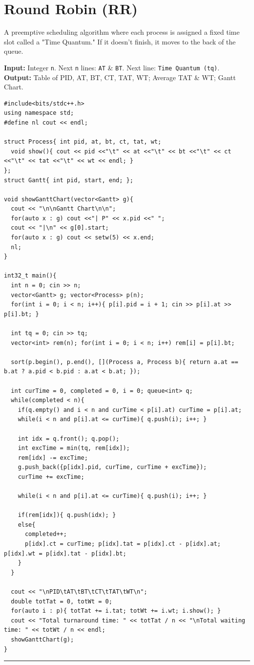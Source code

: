 \documentclass[10pt, a4paper]{article}
\begin{document}
\section{Round Robin (RR)}
A preemptive scheduling algorithm where each process is assigned a fixed time slot called a "Time Quantum." If it doesn't finish, it moves to the back of the queue.

\begin{tcolorbox}[title=Input \& Output Format, iobox]
\textbf{Input:} Integer \texttt{n}. Next \texttt{n} lines: \texttt{AT} \& \texttt{BT}. Next line: \texttt{Time Quantum (tq)}.\\
\textbf{Output:} Table of PID, AT, BT, CT, TAT, WT; Average TAT \& WT; Gantt Chart.
\end{tcolorbox}

\begin{lstlisting}
#include<bits/stdc++.h>
using namespace std;
#define nl cout << endl;

struct Process{ int pid, at, bt, ct, tat, wt;
  void show(){ cout << pid <<"\t" << at <<"\t" << bt <<"\t" << ct <<"\t" << tat <<"\t" << wt << endl; }
};
struct Gantt{ int pid, start, end; };

void showGanttChart(vector<Gantt> g){
  cout << "\n\nGantt Chart\n\n";
  for(auto x : g) cout <<"| P" << x.pid <<" ";
  cout << "|\n" << g[0].start;
  for(auto x : g) cout << setw(5) << x.end;
  nl;
}

int32_t main(){
  int n = 0; cin >> n;
  vector<Gantt> g; vector<Process> p(n);
  for(int i = 0; i < n; i++){ p[i].pid = i + 1; cin >> p[i].at >> p[i].bt; }

  int tq = 0; cin >> tq;
  vector<int> rem(n); for(int i = 0; i < n; i++) rem[i] = p[i].bt;
  
  sort(p.begin(), p.end(), [](Process a, Process b){ return a.at == b.at ? a.pid < b.pid : a.at < b.at; });

  int curTime = 0, completed = 0, i = 0; queue<int> q;
  while(completed < n){
    if(q.empty() and i < n and curTime < p[i].at) curTime = p[i].at;
    while(i < n and p[i].at <= curTime){ q.push(i); i++; }

    int idx = q.front(); q.pop();
    int excTime = min(tq, rem[idx]);
    rem[idx] -= excTime;
    g.push_back({p[idx].pid, curTime, curTime + excTime});
    curTime += excTime;

    while(i < n and p[i].at <= curTime){ q.push(i); i++; }

    if(rem[idx]){ q.push(idx); }
    else{
      completed++;
      p[idx].ct = curTime; p[idx].tat = p[idx].ct - p[idx].at; p[idx].wt = p[idx].tat - p[idx].bt;
    }
  }

  cout << "\nPID\tAT\tBT\tCT\tTAT\tWT\n";
  double totTat = 0, totWt = 0;
  for(auto i : p){ totTat += i.tat; totWt += i.wt; i.show(); }
  cout << "Total turnaround time: " << totTat / n << "\nTotal waiting time: " << totWt / n << endl;
  showGanttChart(g);
}
\end{lstlisting}
\vspace{1em}
\hrule
\vspace{1em}
\end{document}
